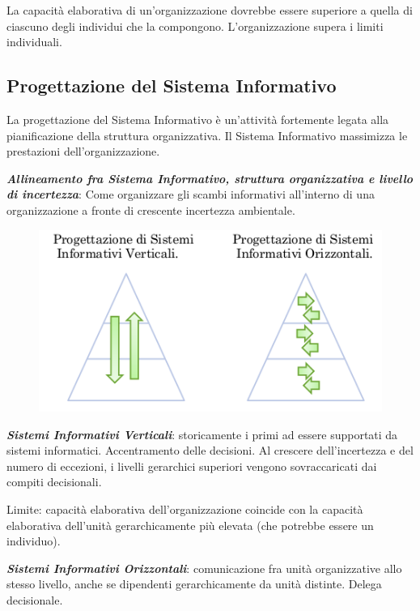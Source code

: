 \documentclass[a4paper, notitlepage, 9pt]{extreport}
\begin{document}
\noindent
La capacità elaborativa di un'organizzazione dovrebbe essere superiore a quella di ciascuno degli individui che la compongono. L'organizzazione supera i limiti individuali.

\subsection*{Progettazione del Sistema Informativo}
La progettazione del Sistema Informativo è un’attività fortemente legata alla pianificazione della struttura organizzativa. Il Sistema Informativo massimizza le prestazioni dell’organizzazione.

\noindent
\textit{\textbf{Allineamento fra Sistema Informativo, struttura organizzativa e livello di incertezza}}: Come organizzare gli scambi informativi all’interno di una organizzazione a fronte di crescente incertezza ambientale.
\begin{figure}[H]
	\centering
	\includegraphics[scale=0.40]{SIVertOriz}
\end{figure}

\noindent
\textit{\textbf{Sistemi Informativi Verticali}}: storicamente i primi ad essere supportati da sistemi informatici. Accentramento delle decisioni. Al crescere dell’incertezza e del numero di eccezioni, i livelli gerarchici superiori vengono sovraccaricati dai compiti decisionali.

Limite: capacità elaborativa dell’organizzazione coincide con la capacità elaborativa dell’unità gerarchicamente più elevata (che potrebbe essere un individuo).
\newline

\noindent
\textit{\textbf{Sistemi Informativi Orizzontali}}: comunicazione fra unità organizzative allo stesso livello, anche se dipendenti gerarchicamente da unità distinte. Delega decisionale.
\end{document}
